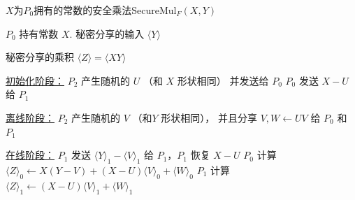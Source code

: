 \begin{algorithm}[h!]
    \caption{$X$为$P_0$拥有的常数的安全乘法\textsf{SecureMul}$_F(X, Y)$}
    \label{alg:perm-llm:secure_mul_fixed}
    \begin{algorithmic}[1]
    \Require $P_0$ 持有常数 $X$. 秘密分享的输入 $\langle Y \rangle$
    
    \Ensure 秘密分享的乘积 $\langle Z \rangle = \langle XY \rangle$
    
    \item[\underline{初始化阶段：}]
    \State $P_2$ 产生随机的 $U$ （和 $X$ 形状相同） 并发送给 $P_0$
    \State $P_0$ 发送 $X - U$ 给 $P_1$
    
    \item[\underline{离线阶段：}]
    \State $P_2$ 产生随机的 $V$ （和$Y$ 形状相同）， 并且分享 $V, W \gets UV$ 给 $P_0$ 和 $P_1$
    
    \item[\underline{在线阶段：}]
    \State $P_1$ 发送 $\langle Y \rangle_1 - \langle V \rangle_1$ 给 $P_1$，$P_1$ 恢复 $X - U$
    \State $P_0$ 计算 $\langle Z \rangle_0 \gets X(Y-V) + (X-U)\langle V \rangle_0 + \langle W \rangle_0$
    \State $P_1$ 计算 $\langle Z \rangle_1 \gets (X-U) \langle V \rangle_1 + \langle W \rangle_1$
    \end{algorithmic}
\end{algorithm}



